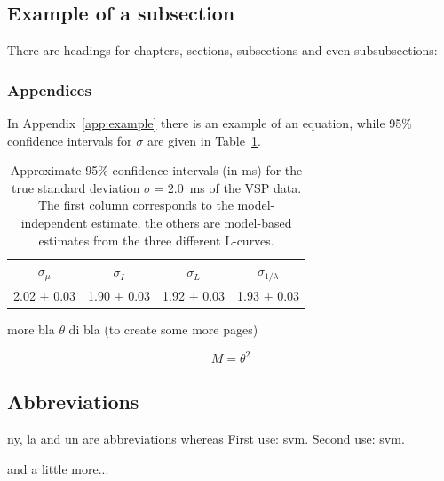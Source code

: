 \subsection{Example of a subsection}

There are headings for chapters, sections, subsections and even
subsubsections:

\subsubsection{Appendices}

In Appendix~\ref{app:example} there is an example of an equation,
while 95\% confidence intervals for $\sigma$ are given in
Table~\ref{table:sigma}.
\begin{table}
  \caption{Approximate 95\% confidence intervals (in ms) for the true 
    standard deviation $\sigma=2.0$~ms of the VSP data. 
    The first column corresponds to the model-independent estimate, 
    the others are model-based estimates from the three different L-curves.} 
  \begin{center} 
    \begin{tabular}{|c|c|c|c|}\hline 
      $\sigma_\mu$  & $\sigma_I$ &$\sigma_{L}$  &$\sigma_{1/\lambda}$  \\
      \hline  
      2.02 $\pm$ 0.03 & 1.90 $\pm$ 0.03  & 1.92 $\pm$ 0.03 & 1.93 $\pm$ 0.03 
      \\ \hline 
    \end{tabular} 
    \label{table:sigma} 
  \end{center} 
\end{table} 

\newpage

more bla $\theta$ di bla (to create some more pages)

\begin{equation}
    M = \theta ^2
\end{equation}


\subsection{Abbreviations}

\gls{ny}, \gls{la} and \gls{un} are abbreviations whereas
First use: \gls{svm}. Second use: \gls{svm}.



\newpage 

and a little more...


